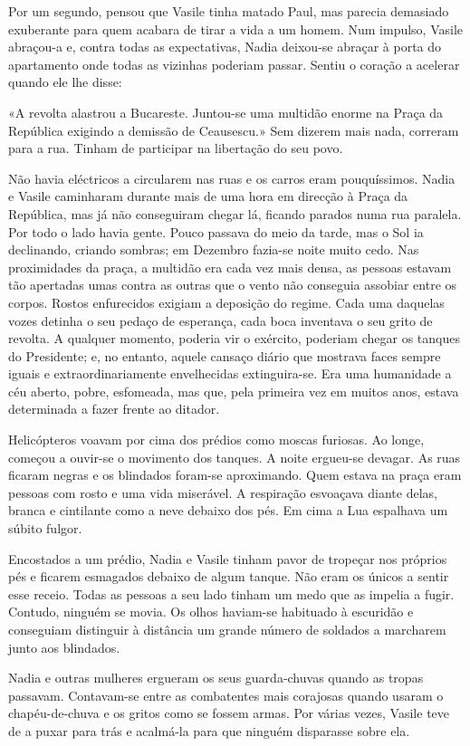 Por um segundo, pensou que Vasile tinha matado Paul, mas parecia
demasiado exuberante para quem acabara de tirar a vida a um homem. Num
impulso, Vasile abraçou-a e, contra todas as expectativas, Nadia
deixou-se abraçar à porta do apartamento onde todas as vizinhas poderiam
passar. Sentiu o coração a acelerar quando ele lhe disse:

«A revolta alastrou a Bucareste. Juntou-se uma multidão enorme na Praça
da República exigindo a demissão de
Ceausescu.» Sem dizerem mais nada, correram para a rua. Tinham de
participar na libertação do seu povo.

Não havia eléctricos a circularem nas ruas e os carros eram
pouquíssimos. Nadia e Vasile caminharam durante mais de uma hora em
direcção à Praça da República, mas já não conseguiram chegar lá, ficando
parados numa rua paralela. Por todo o lado havia gente. Pouco passava do
meio da tarde, mas o Sol ia declinando, criando sombras; em Dezembro
fazia-se noite muito cedo. Nas proximidades da praça, a multidão era
cada vez mais densa, as pessoas estavam tão apertadas umas contra as
outras que o vento não conseguia assobiar entre os corpos. Rostos
enfurecidos exigiam a deposição do regime. Cada uma daquelas vozes
detinha o seu pedaço de esperança, cada boca inventava o seu grito de
revolta. A qualquer momento, poderia vir o exército, poderiam chegar
os tanques do Presidente; e, no entanto, aquele cansaço diário que
mostrava faces sempre iguais e extraordinariamente envelhecidas
extinguira-se. Era uma humanidade a céu aberto, pobre, esfomeada, mas
que, pela primeira vez em muitos anos, estava determinada a fazer frente
ao ditador.

Helicópteros voavam por cima dos prédios como moscas furiosas. Ao longe, começou a ouvir-se o movimento dos tanques. A
noite ergueu-se devagar. As ruas ficaram negras e os blindados foram-se
aproximando. Quem estava na praça eram pessoas com rosto e uma vida
miserável. A respiração esvoaçava diante delas, branca e cintilante como
a neve debaixo dos pés. Em cima a Lua espalhava um súbito fulgor.


Encostados a um prédio, Nadia e Vasile tinham pavor de tropeçar nos
próprios pés e ficarem esmagados debaixo de algum tanque. Não eram os
únicos a sentir esse receio. Todas as pessoas a seu lado tinham um medo
que as impelia a fugir. Contudo, ninguém se movia. Os olhos haviam-se
habituado à escuridão e conseguiam distinguir à distância um grande
número de soldados a marcharem junto aos blindados.

Nadia e outras mulheres ergueram os seus guarda-chuvas quando as tropas passavam. Contavam-se entre as combatentes mais
corajosas quando usaram o chapéu-de-chuva e os gritos como se fossem armas. Por várias vezes, Vasile teve
de a puxar para trás e acalmá-la para que ninguém disparasse sobre
ela.


